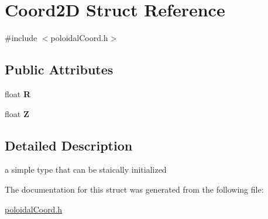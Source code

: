 \hypertarget{structCoord2D}{
\section{Coord2D Struct Reference}
\label{structCoord2D}
}


{\ttfamily \#include $<$poloidalCoord.h$>$}

\subsection*{Public Attributes}
\begin{DoxyCompactItemize}
\item 
\hypertarget{structCoord2D_ace9c2672c56fe87ebe224cb30c536d5a}{
float {\bfseries R}}
\label{structCoord2D_ace9c2672c56fe87ebe224cb30c536d5a}

\item 
\hypertarget{structCoord2D_a74f3264d4c18705c1b1d39995d053971}{
float {\bfseries Z}}
\label{structCoord2D_a74f3264d4c18705c1b1d39995d053971}

\end{DoxyCompactItemize}


\subsection{Detailed Description}
a simple type that can be staically initialized 

The documentation for this struct was generated from the following file:\begin{DoxyCompactItemize}
\item 
\hyperlink{poloidalCoord_8h}{poloidalCoord.h}\end{DoxyCompactItemize}

